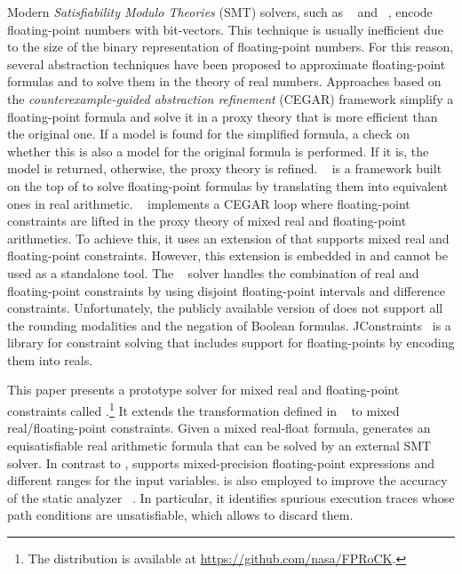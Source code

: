 \documentclass[runningheads,american,orivec,fleqn]{llncs}
\begin{document}
Modern \emph{Satisfiability Modulo Theories} (SMT) solvers, such as \Mathsat~\cite{CimattiGSS13} and \Zt~\cite{MouraB08}, encode floating-point numbers with bit-vectors.
%
This technique is usually inefficient due to the size of the binary representation of floating-point numbers.
%
For this reason, several abstraction techniques have been proposed to approximate floating-point formulas and to solve them in the theory of real numbers.
% 
Approaches based on the \emph{counterexample-guided abstraction refinement} (CEGAR) framework \cite{BrilloutKW09,RamachandranW16,ZeljicBWR18} simplify a floating-point formula and solve it in a proxy theory that is more efficient than the original one.
%
If a model is found for the simplified formula, a check on whether this is also a model for the original formula is performed. If it is, the model is returned, otherwise, the proxy theory is refined.
%
\Realizer{}~\cite{LeeserMRW14} is a framework built on the top of \Zt{} to solve floating-point formulas by translating them into equivalent ones in real arithmetic.
%
\Molly{}~\cite{RamachandranW16} implements a CEGAR loop where floating-point constraints are lifted in the proxy theory of mixed real and floating-point arithmetics.
%
To achieve this, it uses an extension of \Realizer{} that supports mixed real and floating-point constraints.
%
However, this extension is embedded in \Molly{} and cannot be used as a standalone tool. 
% 
The \Colibri~\cite{MarreBC18} solver handles the combination of real and floating-point constraints by using disjoint floating-point intervals and difference constraints.
% 
Unfortunately, the publicly available version of \Colibri{} does not support all the rounding modalities and the negation of Boolean formulas.
%
JConstraints~\cite{jconstraints} is a library for constraint solving that includes support for
floating-points by encoding them into reals.

This paper presents a prototype solver for mixed real and floating-point constraints called \smttool{}.\footnote{The \smttool{} distribution is available at \url{https://github.com/nasa/FPRoCK}.}
% 
It extends the transformation defined in \Realizer{}~\cite{LeeserMRW14} to mixed real/floating-point constraints.
%
Given a mixed real-float formula, \smttool{} generates an equisatisfiable real arithmetic formula that can be solved by an external SMT solver.
%
In contrast to \Realizer, \smttool{} supports mixed-precision floating-point expressions and different ranges for the input variables.
%
\smttool{} is also employed to improve the accuracy of the static analyzer \tool~\cite{TitoloFMM18}.
% 
In particular, it identifies spurious execution traces whose path conditions are unsatisfiable, which allows {\tool{}} to discard them.
\end{document}
